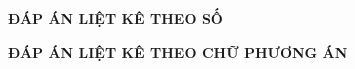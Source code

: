 \documentclass[11pt]{article}
\begin{document}
\newpage
\indapanlietke
\thispagestyle{empty}
\begin{center}
{\bf ĐÁP ÁN LIỆT KÊ THEO SỐ}
\end{center}
\chucauhoi{ }
\begin{enumerate}[\causo]
\begin{multicols}{5}
\foreachproblem[bttracnghiem]{\item\thisproblem}
\end{multicols}
\end{enumerate}



\vspace*{1cm}
\lamtieude
\indapanso
\begin{center}
{\bf ĐÁP ÁN LIỆT KÊ THEO CHỮ PHƯƠNG ÁN}
\end{center}
\begin{center}
\begin{enumerate}[]
\begin{multicols}{6}
\foreachproblem[bttracnghiem]{\item\thisproblem}
\end{multicols}
\end{enumerate}
\end{center}



% 
% 

\newpage
\setcounter{page}{1}
\inphieuduclo
\lamphieuthi
\begin{center}
\begin{multicols}{3}
\begin{enumerate}[\causo]
\foreachproblem[bttracnghiem]{\item\thisproblem}
\end{enumerate}
\end{multicols}
\end{center}
\newpage
 
\inphieuthi
\lamphieuthi
\begin{multicols}{3}
\begin{enumerate}[\causo]
\foreachproblem[bttracnghiem]{\item\thisproblem}
\end{enumerate}
\end{multicols}


\addtocounter{page}{-2}
\end{document}
